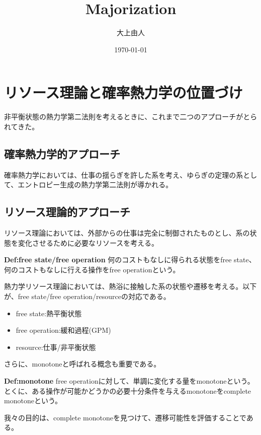\documentclass[a4paper,11pt]{jsarticle}
\numberwithin{equation}{section}
\begin{document}
\title{Majorization}
\author{大上由人}
\date{\today}
\maketitle

\tableofcontents
\newpage

\section{リソース理論と確率熱力学の位置づけ}
非平衡状態の熱力学第二法則を考えるときに、これまで二つのアプローチがとられてきた。\\
\subsection{確率熱力学的アプローチ}
確率熱力学においては、仕事の揺らぎを許した系を考え、ゆらぎの定理の系として、エントロピー生成の熱力学第二法則が導かれる。\\

\subsection{リソース理論的アプローチ}
リソース理論においては、外部からの仕事は完全に制御されたものとし、系の状態を変化させるために必要なリソースを考える。\\
\begin{itembox}[l]{\textbf{Def:free state/free operation}}
    何のコストもなしに得られる状態をfree state、何のコストもなしに行える操作をfree operationという。
\end{itembox}
熱力学リソース理論においては、熱浴に接触した系の状態や遷移を考える。以下が、free state/free operation/resourceの対応である。\\
\begin{itemize}
    \item free state:熱平衡状態
    \item free operation:緩和過程(GPM)
    \item resource:仕事/非平衡状態
\end{itemize}

さらに、monotoneと呼ばれる概念も重要である。\\
\begin{itembox}[l]{\textbf{Def:monotone}}
    free operationに対して、単調に変化する量をmonotoneという。とくに、ある操作が可能かどうかの必要十分条件を与えるmonotoneをcomplete monotoneという。
\end{itembox}
我々の目的は、complete monotoneを見つけて、遷移可能性を評価することである。\\
\end{document}
